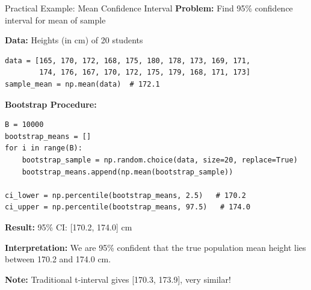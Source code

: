 \documentclass[aspectratio=169]{beamer}
\begin{document}
\begin{frame}[fragile]{Practical Example: Mean Confidence Interval}
\scriptsize
\textbf{Problem:} Find 95\% confidence interval for mean of sample

\vspace{0.05cm}
\textbf{Data:} Heights (in cm) of 20 students
\begin{lstlisting}[basicstyle=\tiny]
data = [165, 170, 172, 168, 175, 180, 178, 173, 169, 171,
        174, 176, 167, 170, 172, 175, 179, 168, 171, 173]
sample_mean = np.mean(data)  # 172.1
\end{lstlisting}

\vspace{0.05cm}
\textbf{Bootstrap Procedure:}
\begin{lstlisting}[basicstyle=\tiny]
B = 10000
bootstrap_means = []
for i in range(B):
    bootstrap_sample = np.random.choice(data, size=20, replace=True)
    bootstrap_means.append(np.mean(bootstrap_sample))

ci_lower = np.percentile(bootstrap_means, 2.5)   # 170.2
ci_upper = np.percentile(bootstrap_means, 97.5)   # 174.0
\end{lstlisting}

\vspace{0.05cm}
\textbf{Result:} 95\% CI: [170.2, 174.0] cm

\vspace{0.05cm}
\textbf{Interpretation:} We are 95\% confident that the true population mean height lies between 170.2 and 174.0 cm.

\vspace{0.05cm}
\textbf{Note:} Traditional t-interval gives [170.3, 173.9], very similar!
\end{frame}
\end{document}
